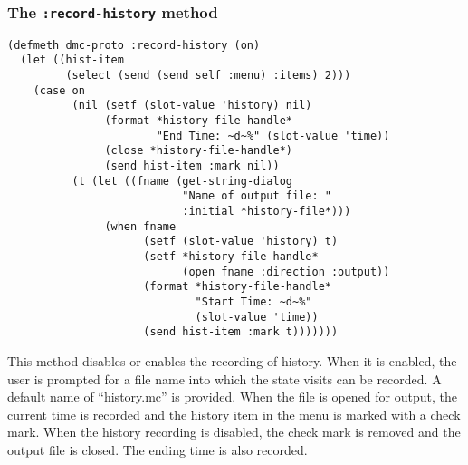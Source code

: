 \subsubsection{The {\tt :record-history} method}
\label{subsubsec:record-history}
\begin{verbatim}
(defmeth dmc-proto :record-history (on)
  (let ((hist-item 
         (select (send (send self :menu) :items) 2)))
    (case on
          (nil (setf (slot-value 'history) nil)
               (format *history-file-handle*
                       "End Time: ~d~%" (slot-value 'time))
               (close *history-file-handle*)
               (send hist-item :mark nil))
          (t (let ((fname (get-string-dialog 
                           "Name of output file: " 
                           :initial *history-file*)))
               (when fname
                     (setf (slot-value 'history) t)
                     (setf *history-file-handle* 
                           (open fname :direction :output))
                     (format *history-file-handle* 
                             "Start Time: ~d~%" 
                             (slot-value 'time))
                     (send hist-item :mark t)))))))
\end{verbatim}
This method disables or enables the recording of history. When it is
enabled, the user is prompted for a file name into which the state
visits can be recorded. A default name of ``history.mc'' is provided.
When the file is opened for output, the current time is recorded and
the history item in the menu is marked with a check mark.  When the
history recording is disabled, the check mark is removed and the
output file is closed. The ending time is also recorded. 

